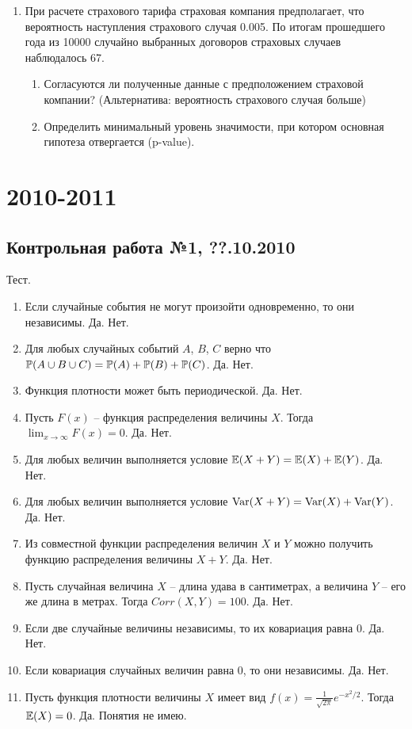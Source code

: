 \documentclass[12pt, a4paper]{article}\usepackage[]{graphicx}\usepackage[]{color}
\begin{document}
\begin{enumerate}
\item При расчете страхового тарифа страховая компания предполагает, что вероятность наступления страхового случая 0.005. По итогам прошедшего года из 10000 случайно выбранных договоров страховых случаев наблюдалось 67.
\begin{enumerate}
\item Согласуются ли полученные данные с предположением страховой компании? (Альтернатива: вероятность страхового случая больше)
\item Определить минимальный уровень значимости, при котором основная гипотеза отвергается (p-value).
\end{enumerate}
\end{enumerate}



\section{2010-2011}



\subsection{Контрольная работа №1, ??.10.2010}

Тест.

\begin{enumerate}
\item Если случайные события не могут произойти одновременно, то они независимы. Да. Нет.
\item  Для любых случайных событий $A$, $B$, $C$ верно что $\P(A\cup B\cup C)=\P(A)+\P(B)+\P(C)$. Да. Нет.
\item  Функция плотности может быть периодической. Да. Нет.
\item  Пусть $F(x)$ -- функция распределения величины $X$. Тогда $\lim_{x\to\infty} F(x)=0$. Да. Нет.
\item  Для любых величин выполняется условие $\E(X+Y)=\E(X)+\E(Y)$. Да. Нет.
\item  Для любых величин выполняется условие $\Var(X+Y)=\Var(X)+\Var(Y)$. Да. Нет.
\item  Из совместной функции распределения величин $X$ и $Y$ можно получить функцию распределения величины $X+Y$. Да. Нет.
\item  Пусть случайная величина $X$ -- длина удава в сантиметрах, а величина $Y$ -- его же длина в метрах. Тогда $Corr(X,Y)=100$. Да. Нет.
\item  Если две случайные величины независимы, то их ковариация равна 0. Да. Нет.
\item  Если ковариация случайных величин равна 0, то они независимы. Да. Нет.
\item  Пусть функция плотности величины $X$ имеет вид  $f(x)=\frac{1}{\sqrt{2\pi}}e^{-x^2/2}$. Тогда $\E(X)=0$. Да. Понятия не имею.
\end{enumerate}
\end{document}
